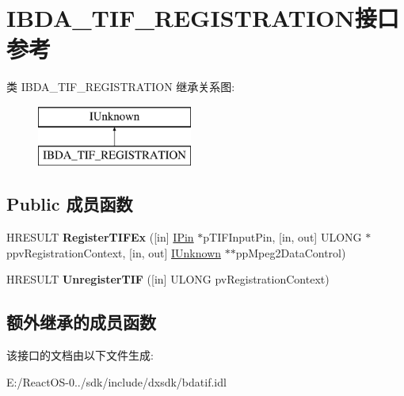 \hypertarget{interface_i_b_d_a___t_i_f___r_e_g_i_s_t_r_a_t_i_o_n}{}\section{I\+B\+D\+A\+\_\+\+T\+I\+F\+\_\+\+R\+E\+G\+I\+S\+T\+R\+A\+T\+I\+O\+N接口 参考}
\label{interface_i_b_d_a___t_i_f___r_e_g_i_s_t_r_a_t_i_o_n}
类 I\+B\+D\+A\+\_\+\+T\+I\+F\+\_\+\+R\+E\+G\+I\+S\+T\+R\+A\+T\+I\+ON 继承关系图\+:\begin{figure}[H]
\begin{center}
\leavevmode
\includegraphics[height=2.000000cm]{interface_i_b_d_a___t_i_f___r_e_g_i_s_t_r_a_t_i_o_n}
\end{center}
\end{figure}
\subsection*{Public 成员函数}
\begin{DoxyCompactItemize}
\item 
\mbox{\label{interface_i_b_d_a___t_i_f___r_e_g_i_s_t_r_a_t_i_o_n_a71c9b76799aafcf175dfe9d77bd1a18b}} 
H\+R\+E\+S\+U\+LT {\bfseries Register\+T\+I\+F\+Ex} (\mbox{[}in\mbox{]} \hyperlink{interface_i_pin}{I\+Pin} $\ast$p\+T\+I\+F\+Input\+Pin, \mbox{[}in, out\mbox{]} U\+L\+O\+NG $\ast$ppv\+Registration\+Context, \mbox{[}in, out\mbox{]} \hyperlink{interface_i_unknown}{I\+Unknown} $\ast$$\ast$pp\+Mpeg2\+Data\+Control)
\item 
\mbox{\label{interface_i_b_d_a___t_i_f___r_e_g_i_s_t_r_a_t_i_o_n_acfd875f914cddd58a631ee8926a5a217}} 
H\+R\+E\+S\+U\+LT {\bfseries Unregister\+T\+IF} (\mbox{[}in\mbox{]} U\+L\+O\+NG pv\+Registration\+Context)
\end{DoxyCompactItemize}
\subsection*{额外继承的成员函数}


该接口的文档由以下文件生成\+:\begin{DoxyCompactItemize}
\item 
E\+:/\+React\+O\+S-\/0../sdk/include/dxsdk/bdatif.\+idl\end{DoxyCompactItemize}

